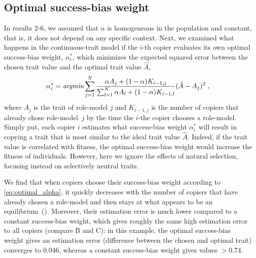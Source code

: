 \documentclass[12pt]{extarticle}
\begin{document}
\subsection*{Optimal success-bias weight}
In results 2-6, we assumed that $\alpha$ is homogeneous in the population and constant, that is, it does not depend on any specific context.
Next, we examined what happens in the continuous-trait model if the $i$-th copier evaluates its own optimal success-bias weight, $\alpha^*_i$, which minimizes the expected squared error between the chosen trait value and the optimal trait value $\hat{A}$,
\begin{equation}\label{eq:optimal_alpha}
\alpha^*_i = \emph{argmin} \sum_{j=1}^N\frac{\alpha A_j + (1-\alpha) K_{i-1,j}}{\sum_{l=1}^N\alpha A_l + (1-\alpha) K_{i-1,l}} (\hat{A}-A_j)^2 \;,
\end{equation}
where $A_j$ is the trait of role-model $j$ and $K_{i-1,j}$ is the number of copiers that already chose role-model~$j$ by the time the $i$-the copier chooses a role-model.
Simply put, each copier $i$ estimates what success-bias weight $\alpha^*_i$ will result in copying a trait that is most similar to the ideal trait value $\hat{A}$.
Indeed, if the trait value is correlated with fitness, the optimal success-bias weight would increase the fitness of individuals. However, here we ignore the effects of natural selection, focusing instead on selectively neutral traits.

We find that when copiers choose their success-bias weight according to \cref{eq:optimal_alpha}, it quickly decreases with the number of copiers that have already chosen a role-model and then stays at what appears to be an equilibrium~().
Moreover, their estimation error is much lower compared to a constant success-bias weight, which gives roughly the same high estimation error to all copiers (compare B and C): in this example, the optimal success-bias weight gives an estimation error (difference between the chosen and optimal trait) converges to $0.046$, whereas a constant success-bias weight gives values $>0.74$.
\end{document}

